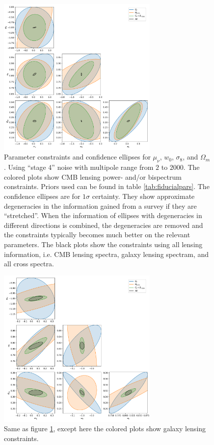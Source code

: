 \documentclass[11pt]{article} %
\begin{document}
\begin{figure}
    \centering
    \includegraphics[width=0.7\textwidth]{figures/param_constraints_tight_cmb.pdf}
    \caption{Parameter constraints and confidence ellipses for $\mu_\nu$, $w_0$, $\sigma_8$, and $\Omega_m$. Using ``stage 4'' noise with multipole range from $2$ to $2000$. The colored plots show CMB lensing power- and/or bispectrum constraints. Priors used can be found in table \ref{tab:fiducialpars}. The confidence ellipses are for $1\sigma$ certainty. They show approximate degeneracies in the information gained from a survey if they are ``stretched''. When the information of ellipses with degeneracies in different directions is combined, the degeneracies are removed and the constraints typically becomes much better on the relevant parameters. The black plots show the constraints using all lensing information, i.e. CMB lensing spectra, galaxy lensing spectram, and all cross spectra.}
    \label{fig:paramconstraintstightcmb}
\end{figure}
\begin{figure}
    \centering
    \includegraphics[width=0.7\textwidth]{figures/param_constraints_tight_gal.pdf}
    \caption{Same as figure \ref{fig:paramconstraintstightcmb}, except here the colored plots show galaxy lensing constraints.}
    \label{fig:paramconstraintstightgal}
\end{figure}
\end{document}
